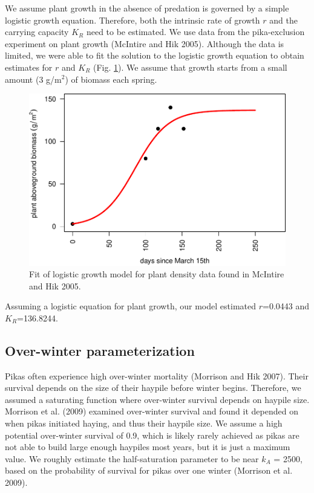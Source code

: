 \documentclass[12pt,]{article}
\begin{document}
We assume plant growth in the absence of predation is governed by a
simple logistic growth equation. Therefore, both the intrinsic rate of
growth \(r\) and the carrying capacity \(K_R\) need to be estimated. We
use data from the pika-exclusion experiment on plant growth (McIntire
and Hik 2005). Although the data is limited, we were able to fit the
solution to the logistic growth equation to obtain estimates for \(r\)
and \(K_R\) (Fig. \ref{fig:plant_growth}). We assume that growth starts
from a small amount (3 g/\(\mbox{m}^2\)) of biomass each spring.

\begin{figure}
\centering
\includegraphics{White_et_al_pika_phenology_supp_mat_files/figure-latex/unnamed-chunk-4-1.pdf}
\caption{Fit of logistic growth model for plant density data found in
McIntire and Hik 2005.\label{fig:plant_growth}}
\end{figure}

Assuming a logistic equation for plant growth, our model estimated
\(r\)=0.0443 and \(K_R\)=136.8244.

\subsection{Over-winter parameterization}

Pikas often experience high over-winter mortality (Morrison and Hik
2007). Their survival depends on the size of their haypile before winter
begins. Therefore, we assumed a saturating function where over-winter
survival depends on haypile size. Morrison et al. (2009) examined
over-winter survival and found it depended on when pikas initiated
haying, and thus their haypile size. We assume a high potential
over-winter survival of 0.9, which is likely rarely achieved as pikas
are not able to build large enough haypiles most years, but it is just a
maximum value. We roughly estimate the half-saturation parameter to be
near \(k_A\) = 2500, based on the probability of survival for pikas over
one winter (Morrison et al. 2009).
\end{document}
